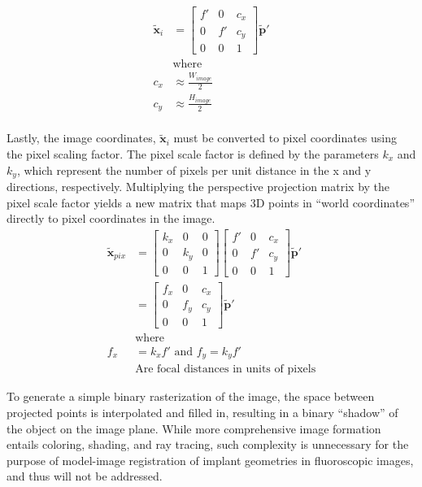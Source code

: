 \begin{equation}
    \begin{aligned}
        \tilde{\mathbf{x}}_{i} &= \begin{bmatrix}
            f' & 0 & c_x \\ 0 & f' & c_y \\ 0 & 0 & 1 
        \end{bmatrix} \tilde{\mathbf{p}}' \\
        &\text{where} \\
        c_x &\approx \frac{W_{image}}{2} \\
        c_y &\approx \frac{H_{image}}{2} \\
    \end{aligned}
    \label{eq:principal-point}
\end{equation}


Lastly, the image coordinates, $\tilde{\mathbf{x}}_{i}$ must be converted to pixel coordinates using the pixel scaling factor.
The pixel scale factor is defined by the parameters $k_x$ and $k_y$, which represent the number of pixels per unit distance in the x and y directions, respectively.
Multiplying the perspective projection matrix by the pixel scale factor yields a new matrix that maps 3D points in ``world coordinates'' directly to pixel coordinates in the image.
\begin{equation}
    \begin{aligned}
        \tilde{\mathbf{x}}_{pix} &= \begin{bmatrix}
            k_x & 0& 0 \\ 0 & k_y & 0 \\ 0 & 0 & 1
        \end{bmatrix} \begin{bmatrix}
            f' & 0 & c_x \\ 0 & f' & c_y \\ 0 & 0 & 1 
        \end{bmatrix}\tilde{\mathbf{p}}' \\
        & = \begin{bmatrix}
            f_x & 0 & c_x \\ 0 & f_y & c_y \\ 0 & 0 & 1 
        \end{bmatrix}\tilde{\mathbf{p}}'\\
        &\text{where}\\
        f_x &= k_x f' \text{        and        } f_y = k_y f' \\
        &\text{Are focal distances in units of pixels} 
    \end{aligned}
    \label{eq:pixel-scaling}
\end{equation}


To generate a simple binary rasterization of the image, the space between projected points is interpolated and filled in, resulting in a binary ``shadow'' of the object on the image plane.
While more comprehensive image formation entails coloring, shading, and ray tracing, such complexity is unnecessary for the purpose of model-image registration of implant geometries in fluoroscopic images, and thus will not be addressed.

